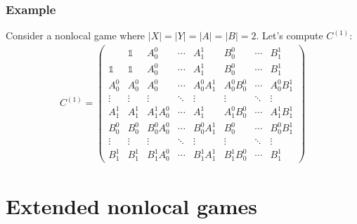 \documentclass{beamer}
\def\I{\mathds{1}}
\newcommand{\abs}[1]{\lvert #1 \rvert}
\begin{document}
\begin{frame}
	\frametitle{Example}
	Consider a nonlocal game where $\abs{X} = \abs{Y} = \abs{A} = \abs{B} = 2$. Let's compute $C^{(1)}$:
	\[
\begin{aligned}
C^{(1)} =
\left(
\begin{array}{c||cccc|ccc}
 & \I & A_0^0 & \cdots & A_1^1 & B_0^0 & \cdots & B_1^1 \\
\hline\hline 
\I & \I & A_0^0 & \cdots & A_1^1 & B_0^0 & \cdots & B_1^1 \\
A_0^0 & A_0^0 & A_0^0 & \cdots & A_0^0 A_1^1 & A_0^0 B_0^0 & \cdots & A_0^0 B_1^1 \\
\vdots & \vdots & \vdots & \ddots & \vdots & \vdots  & \ddots & \vdots \\
A_1^1 & A_1^1 & A_1^1 A_0^0 & \cdots & A_1^1 & A_1^0 B_0^0 & \cdots & A_1^1 B_1^1 \\
\hline 
B_0^0 & B_0^0 & B_0^0 A_0^0 & \cdots & B_0^0 A_1^1 & B_0^0 & \cdots & B_0^0 B_1^1 \\
\vdots & \vdots & \vdots & \ddots & \vdots & \vdots  & \ddots & \vdots \\
B_1^1 & B_1^1 & B_1^1 A_0^0 & \cdots & B_1^1 A_1^1 & B_1^1 B_0^0 & \cdots & B_1^1
\end{array}
\right) 
\end{aligned}
\]
\end{frame}


  \section{Extended nonlocal games}
\end{document}
